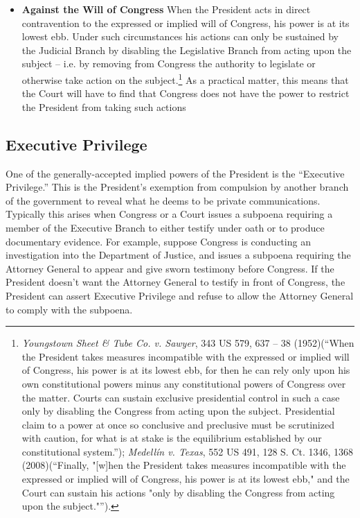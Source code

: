 \begin{itemize}
\item \textbf{Against the Will of Congress} When the President acts in direct contravention to the expressed or implied will of Congress, his power is at its lowest ebb.  Under such circumstances his actions can only be sustained by the Judicial Branch by disabling the Legislative Branch from acting upon the subject -- i.e. by removing from Congress the authority to legislate or otherwise take action on the subject.\footnote{\textit{Youngstown Sheet \& Tube Co. v. Sawyer}, 343 US 579, 637 -- 38 (1952)(``When the President takes measures incompatible with the expressed or implied will of Congress, his power is at its lowest ebb, for then he can rely only upon his own constitutional powers minus any constitutional powers of Congress over the matter. Courts can sustain exclusive presidential control in such a case only by disabling the Congress from acting upon the subject. Presidential claim to a power at once so conclusive and preclusive must be scrutinized with caution, for what is at stake is the equilibrium established by our constitutional system.''); \textit{Medellín v. Texas}, 552 US 491, 128 S. Ct. 1346, 1368 (2008)(``Finally, "[w]hen the President takes measures incompatible with the expressed or implied will of Congress, his power is at its lowest ebb," and the Court can sustain his actions "only by disabling the Congress from acting upon the subject."'').}  As a practical matter, this means that the Court will have to find that Congress does not have the power to restrict the President from taking such actions

\end{itemize}

\subsection{Executive Privilege}

One of the generally-accepted implied powers of the President is the ``Executive Privilege.''  This is the President's exemption from compulsion by another branch of the government to reveal what he deems to be private communications.  Typically this arises when Congress or a Court issues a subpoena requiring a member of the Executive Branch to either testify under oath or to produce documentary evidence.  For example, suppose Congress is conducting an investigation into the Department of Justice, and issues a subpoena requiring the Attorney General to appear and give sworn testimony before Congress.  If the President doesn't want the Attorney General to testify in front of Congress, the President can assert Executive Privilege and refuse to allow the Attorney General to comply with the subpoena.  

